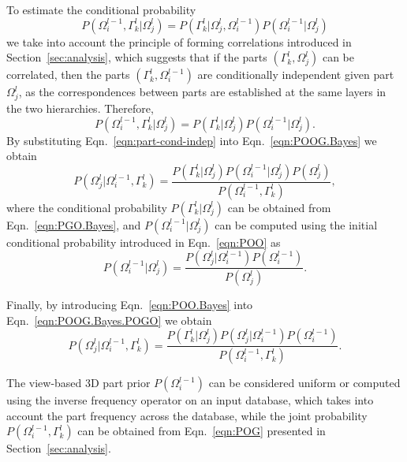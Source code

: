 \documentclass[runningheads]{llncs}
\begin{document}
To estimate the conditional probability
\begin{equation}
 P(\Omega_i^{l-1},\Gamma_k^l \vert \Omega_j^{l}) =  P(\Gamma_k^l \vert \Omega_j^{l},\Omega_i^{l-1}) P(\Omega_i^{l-1} \vert \Omega_j^{l})
\end{equation}
we take into account the principle of forming correlations introduced in Section~\ref{sec:analysis}, which suggests that if the parts $(\Gamma_k^l,\Omega_j^{l})$ can be correlated, then the parts $(\Gamma_k^l,\Omega_i^{l-1})$ are conditionally independent given part $\Omega_j^{l}$, as the correspondences between parts are established at the same layers in the two hierarchies. Therefore,
\begin{equation}
  P(\Omega_i^{l-1},\Gamma_k^l \vert \Omega_j^{l}) =  P(\Gamma_k^l \vert \Omega_j^{l}) P(\Omega_i^{l-1} \vert \Omega_j^{l}).
  \label{eqn:part-cond-indep}
\end{equation}
By substituting Eqn.~\ref{eqn:part-cond-indep} into Eqn.~\ref{eqn:POOG.Bayes} we obtain
\begin{equation}
  P(\Omega_j^{l} \vert \Omega_i^{l-1},\Gamma_k^l) = \frac{P(\Gamma_k^l \vert \Omega_j^{l})P(\Omega_i^{l-1} \vert \Omega_j^{l})P(\Omega_j^{l})}{P(\Omega_i^{l-1},\Gamma_k^l)},
  \label{eqn:POOG.Bayes.POGO}
\end{equation}
where the conditional probability $P(\Gamma_k^l \vert \Omega_j^l)$ can be obtained from Eqn.~\ref{eqn:PGO.Bayes}, and $P(\Omega_i^{l-1} \vert \Omega_j^{l})$ can be computed using the initial conditional probability introduced in Eqn.~\ref{eqn:POO} as
\begin{equation}
  P(\Omega_i^{l-1} \vert \Omega_j^{l}) = \frac{P(\Omega_j^{l}\vert \Omega_i^{l-1})P(\Omega_i^{l-1})}{P(\Omega_j^{l})}.
  \label{eqn:POO.Bayes}
 \end{equation}

Finally, by introducing Eqn.~\ref{eqn:POO.Bayes} into Eqn.~\ref{eqn:POOG.Bayes.POGO} we obtain
\begin{equation}
 P(\Omega_j^{l} \vert \Omega_i^{l-1},\Gamma_k^l) = \frac{P(\Gamma_k^l \vert \Omega_j^{l})P(\Omega_j^{l} \vert \Omega_i^{l-1})P(\Omega_i^{l-1})}{P(\Omega_i^{l-1},\Gamma_k^l)}.
\end{equation}
  
The view-based 3D part prior $P(\Omega_i^{l-1})$ can be considered uniform or computed using the inverse frequency operator on an input database, which takes into account the part frequency across the database, while the joint probability $P(\Omega_i^{l-1},\Gamma_k^l)$ can be obtained from Eqn.~\ref{eqn:POG} presented in Section~\ref{sec:analysis}.
\end{document}
